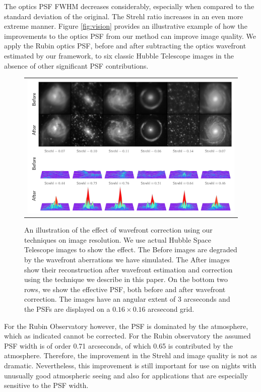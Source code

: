 The optics PSF FWHM decreases considerably, especially when compared to the standard deviation of the original. The Strehl ratio increases in an even more extreme manner. Figure \ref{fig:vision} provides an illustrative example of how the improvements to the optics PSF from our method can improve image quality. We apply the Rubin optics PSF, before and after subtracting the optics wavefront estimated by our framework, to six classic Hubble Telescope images in the absence of other significant PSF contributions.

\begin{figure}[!htbp]
\begin{center}
\begin{tabular}{c}
\includegraphics[width=\textwidth]{figs/interp/results.png}
\end{tabular}
\end{center}
\caption[Illustrative Hubble Telescope Images After Correction From Our Framework]{An illustration of the effect of wavefront correction using our techniques on image resolution.  We use actual Hubble Space Telescope images to show the effect.  The Before images are degraded by the wavefront aberrations we have simulated.  The After images show their reconstruction after wavefront estimation and correction using the technique we describe in this paper. On the bottom two rows, we show the effective PSF, both before and after wavefront correction. The images have an angular extent of 3 arcseconds and the PSFs are displayed on a $0.16 \times 0.16$ arcsecond grid. \label{fig:results}}
\end{figure}

For the Rubin Observatory however, the PSF is dominated by the atmosphere, which as indicated cannot be corrected. For the Rubin observatory the assumed PSF width is of order 0.71 arcseconds, of which 0.65 is contributed by the atmosphere. Therefore, the improvement in the Strehl and image quality is not as dramatic. Nevertheless, this improvement is still important for use on nights with unusually good atmospheric seeing and also for applications that are especially sensitive to the PSF width.
